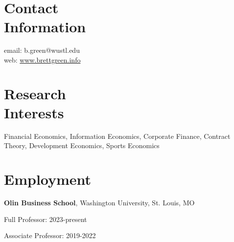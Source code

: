 \documentclass[margin,line,11pt]{resume}
\begin{document}

\begin{resume}



    \section{\mysidestyle Contact\\Information}

    email: b.green@wustl.edu \\
    web: \href{http://www.brettgreen.info}{{\color{blue}www.brettgreen.info}}


%
%
%


    \section{\mysidestyle Research\\Interests}

    Financial Economics,  Information Economics, Corporate Finance, Contract Theory, Development Economics, Sports Economics


    \section{\mysidestyle Employment}

    {\bf Olin Business School}, Washington University, St. Louis, MO  %
     \begin{list1}
     \item[] Full Professor: 2023-present
    \item[] Associate Professor: 2019-2022
\end{list1}



\end{resume}
\end{document}
